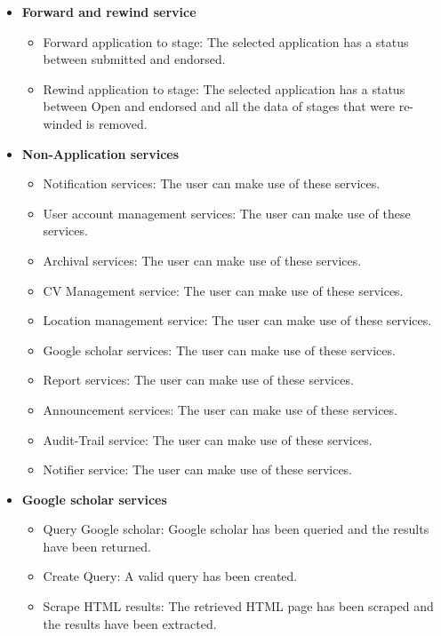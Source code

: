 \documentclass[12pt]{article}
\begin{document}
\begin{itemize}
	\item \textbf{Forward and rewind service}
		\begin{itemize}
			\item Forward application to stage: The selected application has a status between submitted and endorsed.
			\item Rewind application to stage: The selected application has a status between Open and endorsed and all the data of stages that were re-winded is removed. 						
		\end{itemize}

	\item \textbf{Non-Application services}
		\begin{itemize}
			\item Notification services: The user can make use of these services.
			\item User account management services: The user can make use of these services.
			\item Archival services: The user can make use of these services.
			\item CV Management service: The user can make use of these services.
			\item Location management service: The user can make use of these services.
			\item Google scholar services: The user can make use of these services.
			\item Report services: The user can make use of these services.
			\item Announcement services: The user can make use of these services.
			\item Audit-Trail service: The user can make use of these services.
			\item Notifier service: The user can make use of these services.						
		\end{itemize}
		
	\item \textbf{Google scholar services}
		\begin{itemize}
			\item Query Google scholar: Google scholar has been queried and the results have been returned.
			\item Create Query: A valid query has been created.
			\item Scrape HTML results: The retrieved HTML page has been scraped and the results have been extracted.							
		\end{itemize}
		

\end{itemize}
\end{document}

